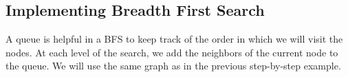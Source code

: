 \subsection*{Implementing Breadth First Search}

A queue is helpful in a BFS to keep track of the order in which we will visit the nodes.
At each level of the search, we add the neighbors of the current node to the queue.
We will use the same graph as in the previous step-by-step example.

